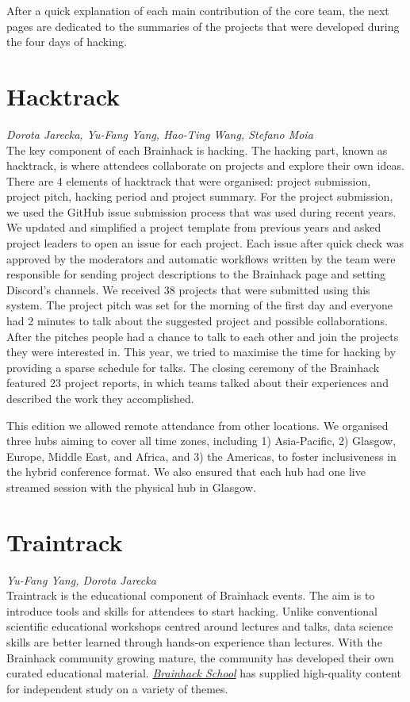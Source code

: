 \documentclass[10pt,a4paper,twocolumns]{proc}
\newcommand{\authors}[1]{\emph{\footnotesize #1} \\}
\begin{document}
After a quick explanation of each main contribution of the core team, the next pages are dedicated to the summaries of the projects that were developed during the four days of hacking.

\section{Hacktrack}

\authors{Dorota Jarecka, %
Yu-Fang Yang, %
Hao-Ting Wang, %
Stefano Moia}
%

The key component of each Brainhack is hacking. The hacking part, known as
hacktrack, is where attendees collaborate on projects and explore their
own ideas. There are 4 elements of hacktrack that were organised:
project submission, project pitch, hacking period and project summary.
For the project submission, we used the GitHub issue submission process
that was used during recent years. We updated and simplified a
project template from previous years and asked project leaders to open
an issue for each project. Each issue after quick check was approved by
the moderators and automatic workflows written by the team were
responsible for sending project descriptions to the Brainhack page and
setting Discord's channels. We received 38 projects that were submitted
using this system. The project pitch was set for the morning of the
first day and everyone had 2 minutes to talk about the suggested project
and possible collaborations. After the pitches people had a chance to
talk to each other and join the projects they were interested in. This
year, we tried to maximise the time for hacking by providing a sparse
schedule for talks. The closing ceremony of the Brainhack featured 23
project reports, in which teams talked about their experiences and
described the work they accomplished.

This edition we allowed remote attendance from other locations. We
organised three hubs aiming to cover all time zones, including 1)
Asia-Pacific, 2) Glasgow, Europe, Middle East, and Africa, and 3) the
Americas, to foster inclusiveness in the hybrid conference format. We also
ensured that each hub had one live streamed session with the physical
hub in Glasgow.

\section{Traintrack}
\authors{Yu-Fang Yang, %
Dorota Jarecka}
%

Traintrack is the educational component of Brainhack events. The aim is
to introduce tools and skills for attendees to start hacking. Unlike
conventional scientific educational workshops centred around lectures
and talks, data science skills are better learned through hands-on
experience than lectures. With the Brainhack community growing mature,
the community has developed their own curated educational material.
\href{https://school.brainhackmtl.org/}{\emph{Brainhack School}} has
supplied high-quality content for independent study on a variety of
themes.
\end{document}

